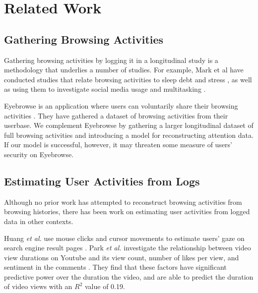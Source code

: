 \documentclass{sigchi}
\begin{document}
\pagebreak

\section{Related Work}

\subsection{Gathering Browsing Activities}

Gathering browsing activities by logging it in a longitudinal study is a methodology that underlies a number of studies. For example, Mark et al have conducted studies that relate browsing activities to sleep debt \cite{mark2016sleep} and stress \cite{mark2014stress}, as well as using them to investigate social media usage \cite{wang2015coming} and multitasking \cite{mark2015focused}.

Eyebrowse is an application where users can voluntarily share their browsing activities \cite{eyebrowse}. They have gathered a dataset of browsing activities from their userbase. %
We complement Eyebrowse by gathering a larger longitudinal dataset of full browsing activities and introducing a model for reconstructing attention data. If our model is successful, however, it may threaten some measure of users' security on Eyebrowse.

\subsection{Estimating User Activities from Logs}

Although no prior work has attempted to reconstruct browsing activities from browsing histories, there has been work on estimating user activities from logged data in other contexts.

Huang \emph{et al.} use mouse clicks and cursor movements to estimate users' gaze on search engine result pages \cite{huang2011no, huang2012user}. Park \emph{et al.} investigate the relationship between video view durations on Youtube and its view count, number of likes per view, and sentiment in the comments \cite{youtubeduration}. They find that these factors have significant predictive power over the duration the video, and are able to predict the duration of video views with an $R^2$ value of 0.19.
\end{document}
